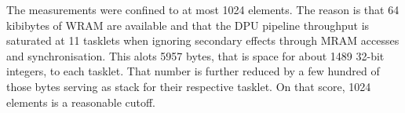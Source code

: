 The measurements were confined to at most 1024 elements.
The reason is that 64 kibibytes of WRAM are available and that the DPU pipeline throughput is saturated at 11 tasklets when ignoring secondary effects through MRAM accesses and synchronisation.
This alots 5957 bytes, that is space for about 1489 32-bit integers, to each tasklet.
That number is further reduced by a few hundred of those bytes serving as stack for their respective tasklet.
On that score, 1024 elements is a reasonable cutoff.












